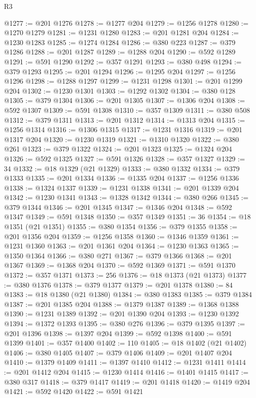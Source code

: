 \begin{lexlean}{R3}
\begin{coremodule}
@1277 := @201 @1276
@1278 := @1277 @204
@1279 := @1256 @1278
@1280 := @1270 @1279
@1281 := @1231 @1280
@1283 := @201 @1281 @204
@1284 := @1230 @1283
@1285 := @1274 @1284
@1286 := @380 @223
@1287 := @379 @1286
@1288 := @201 @1287
@1289 := @1288 @204
@1290 := @592 @1289
@1291 := @591 @1290
@1292 := @357 @1291
@1293 := @380 @498
@1294 := @379 @1293
@1295 := @201 @1294
@1296 := @1295 @204
@1297 := @1256 @1296
@1298 := @1288 @1297
@1299 := @1231 @1298
@1301 := @201 @1299 @204
@1302 := @1230 @1301
@1303 := @1292 @1302
@1304 := @380 @128
@1305 := @379 @1304
@1306 := @201 @1305
@1307 := @1306 @204
@1308 := @592 @1307
@1309 := @591 @1308
@1310 := @357 @1309
@1311 := @380 @508
@1312 := @379 @1311
@1313 := @201 @1312
@1314 := @1313 @204
@1315 := @1256 @1314
@1316 := @1306 @1315
@1317 := @1231 @1316
@1319 := @201 @1317 @204
@1320 := @1230 @1319
@1321 := @1310 @1320
@1322 := @380 @261
@1323 := @379 @1322
@1324 := @201 @1323
@1325 := @1324 @204
@1326 := @592 @1325
@1327 := @591 @1326
@1328 := @357 @1327
@1329 := 34
@1332 := @18 @1329 (@21 @1329)
@1333 := @380 @1332
@1334 := @379 @1333
@1335 := @201 @1334
@1336 := @1335 @204
@1337 := @1256 @1336
@1338 := @1324 @1337
@1339 := @1231 @1338
@1341 := @201 @1339 @204
@1342 := @1230 @1341
@1343 := @1328 @1342
@1344 := @380 @266
@1345 := @379 @1344
@1346 := @201 @1345
@1347 := @1346 @204
@1348 := @592 @1347
@1349 := @591 @1348
@1350 := @357 @1349
@1351 := 36
@1354 := @18 @1351 (@21 @1351)
@1355 := @380 @1354
@1356 := @379 @1355
@1358 := @201 @1356 @204
@1359 := @1256 @1358
@1360 := @1346 @1359
@1361 := @1231 @1360
@1363 := @201 @1361 @204
@1364 := @1230 @1363
@1365 := @1350 @1364
@1366 := @380 @271
@1367 := @379 @1366
@1368 := @201 @1367
@1369 := @1368 @204
@1370 := @592 @1369
@1371 := @591 @1370
@1372 := @357 @1371
@1373 := 256
@1376 := @18 @1373 (@21 @1373)
@1377 := @380 @1376
@1378 := @379 @1377
@1379 := @201 @1378
@1380 := 84
@1383 := @18 @1380 (@21 @1380)
@1384 := @380 @1383
@1385 := @379 @1384
@1387 := @201 @1385 @204
@1388 := @1379 @1387
@1389 := @1368 @1388
@1390 := @1231 @1389
@1392 := @201 @1390 @204
@1393 := @1230 @1392
@1394 := @1372 @1393
@1395 := @380 @276
@1396 := @379 @1395
@1397 := @201 @1396
@1398 := @1397 @204
@1399 := @592 @1398
@1400 := @591 @1399
@1401 := @357 @1400
@1402 := 110
@1405 := @18 @1402 (@21 @1402)
@1406 := @380 @1405
@1407 := @379 @1406
@1409 := @201 @1407 @204
@1410 := @1379 @1409
@1411 := @1397 @1410
@1412 := @1231 @1411
@1414 := @201 @1412 @204
@1415 := @1230 @1414
@1416 := @1401 @1415
@1417 := @380 @317
@1418 := @379 @1417
@1419 := @201 @1418
@1420 := @1419 @204
@1421 := @592 @1420
@1422 := @591 @1421

\end{coremodule}
\end{lexlean}
